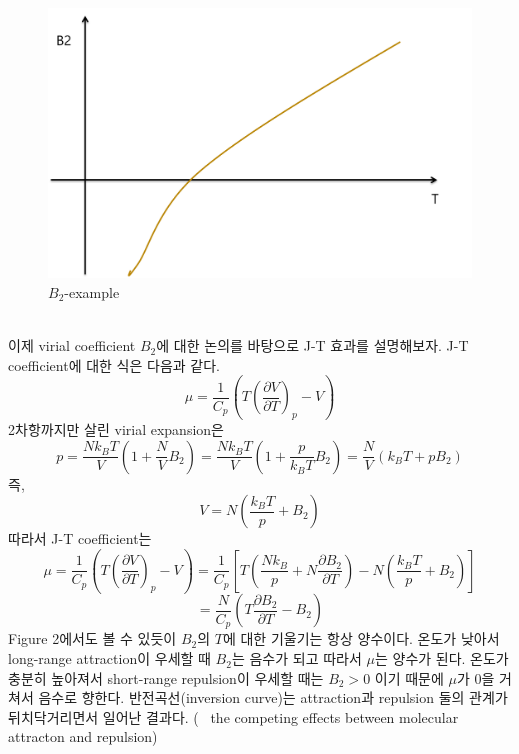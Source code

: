 \documentclass[a4paper,12pt]{article}
\begin{document}
\begin{figure}[h]
	\centering
	\includegraphics[width=0.5\columnwidth]{B2.png}
	\caption{$B_2$-example}
\end{figure}\\
이제 virial coefficient $B_2$에 대한 논의를 바탕으로 J-T 효과를 설명해보자. J-T coefficient에 대한 식은 다음과 같다.
$$\mu=\frac{1}{C_p}\left(T\left( \frac{\partial V}{\partial T}\right)_p-V  \right) $$
2차항까지만 살린 virial expansion은 
$$p=\frac{Nk_BT}{V}\left(1+\frac{N}{V}B_2 \right)=\frac{Nk_BT}{V}\left(1+\frac{p}{k_BT}B_2 \right)=\frac{N}{V}(k_BT+pB_2) $$
즉,
$$V=N\left(\frac{k_BT}{p}+B_2 \right) $$
따라서 J-T coefficient는
$$\mu=\frac{1}{C_p}\left(T\left( \frac{\partial V}{\partial T}\right)_p-V  \right)=\frac{1}{C_p}\left[T\left( \frac{Nk_B}{p}+N\frac{\partial B_2}{\partial T}\right)-N\left(\frac{k_BT}{p}+B_2 \right)   \right]  $$
$$=\frac{N}{C_p}\left(T\frac{\partial B_2}{\partial T}-B_2 \right) $$
Figure 2에서도 볼 수 있듯이 $B_2$의 $T$에 대한 기울기는 항상 양수이다. 온도가 낮아서 long-range attraction이 우세할 때 $B_2$는 음수가 되고 따라서 $\mu$는 양수가 된다. 온도가 충분히 높아져서 short-range repulsion이 우세할 때는 $B_2>0$ 이기 때문에 $\mu$가 0을 거쳐서 음수로 향한다. 반전곡선(inversion curve)는 attraction과 repulsion 둘의 관계가 뒤치닥거리면서 일어난 결과다. (~ the competing effects between molecular attracton and repulsion) 
\end{document}
